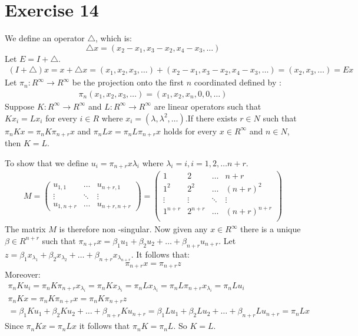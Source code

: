 \section{Exercise 14}
We define an operator $\bigtriangleup$, which is:
\begin{equation*}
\bigtriangleup x = (x_2-x_1 ,x_3-x_2 , x_4-x_3 , \ldots)
\end{equation*}
Let $E = I + \bigtriangleup$.
\begin{gather*}
(I+ \bigtriangleup)x = x + \bigtriangleup x = ( x_1 ,x_2 ,x_3 , \ldots ) + (x_2-x_1 ,x_3 -x_2,x_4-x_3 ,\ldots ) =  (x_2 ,x_3 ,\ldots) = Ex
\end{gather*}
Let $\pi_n : R^\infty \to R^\infty $ be the projection onto the first $n$ coordinated defined by :
\begin{gather*}
\pi_n (x_1,x_2,x_3 , \ldots) = (x_1,x_2,x_n, 0 ,0, \ldots)
\end{gather*}
Suppose $K : R^{\infty} \to R^{\infty} $ and $L : R^{\infty} \to R^{\infty}$ are linear operators such that $Kx_i = Lx_i$ for every $i \in R$ where $x_i = (\lambda,\lambda^2 , \ldots)$.If there exists $r \in N$ such that $\pi_n K x = \pi_n K \pi_{n+r}x$ and $\pi_n L x = \pi_n L \pi_{n+r} x$ holds for every $x \in R^{\infty}$ and $n \in N$, then $K=L$.

To show that we define $u_i = \pi_{n+r}x \lambda_i$ where $\lambda_i = i, i = 1,2, \ldots n+r$.
\begin{gather*}
M = \left( \begin{array}{ccc}
u_{1,1} &\hdots & u_{n+r,1}\\
\vdots & \ddots & \vdots \\
u_{1,n+r}& \hdots & u_{n+r,n+r}
\end{array} \right)=
\left( \begin{array}{cccc}
1 & 2 & \hdots & n+r \\
1^2&2^2 & \hdots & (n+r)^2 \\
\vdots& \vdots & \ddots & \vdots\\
1^{n+r} & 2^{n+r} & \hdots & (n+r)^{n+r}\\
\end{array} \right)
\end{gather*}
The matrix $M$ is therefore non -singular. Now given any $x \in R^{\infty}$ there is a unique $\beta \in R^{n+r}$ such that $\pi_{n+r} x = \beta_1 u_1 + \beta_2 u_2 + \ldots + \beta_{n+r} u_{n+r}$. Let $z = \beta_1 x_{\lambda_1} + \beta_2 x_{\lambda_2} + \ldots + \beta_{n+r} x_{\lambda_{n+r}}$.
It follows that:
\begin{equation*}
\pi_{n+r} x = \pi_{n+r}z
\end{equation*}
Moreover:
\begin{gather*}
\pi_n K u_i = \pi_n K \pi_{n+r}x_{\lambda_i} = \pi_n K x_{\lambda_i} = \pi_n L x_{\lambda_i} = \pi_n L \pi_{n+r} x_{\lambda_i} = \pi_n L u_i \\
\pi_n K x = \pi_n K \pi_{n+r} x = \pi_n K \pi_{n+r} z \\
= \beta_1 K u_1 + \beta_2 K u_2 + \ldots + \beta_{n+r} K u_{n+r} = \beta_1 L u_1 + \beta_2 L u_2 + \ldots + \beta_{n+r} L u_{n+r} = \pi_n L x
\end{gather*}
Since $\pi_n K x = \pi_n L x$ it follows that $\pi_n K = \pi_n L$. So $K = L$.

